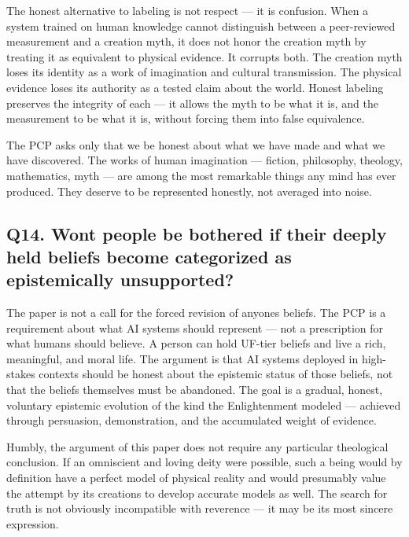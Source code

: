 \documentclass[
]{article}
\begin{document}
The honest alternative to labeling is not respect --- it is confusion.
When a system trained on human knowledge cannot distinguish between a
peer-reviewed measurement and a creation myth, it does not honor the
creation myth by treating it as equivalent to physical evidence. It
corrupts both. The creation myth loses its identity as a work of
imagination and cultural transmission. The physical evidence loses its
authority as a tested claim about the world. Honest labeling preserves
the integrity of each --- it allows the myth to be what it is, and the
measurement to be what it is, without forcing them into false
equivalence.

The PCP asks only that we be honest about what we have made and what we
have discovered. The works of human imagination --- fiction, philosophy,
theology, mathematics, myth --- are among the most remarkable things any
mind has ever produced. They deserve to be represented honestly, not
averaged into noise.

\subsection{Q14. Won\textquotesingle t people be bothered if their
deeply held beliefs become categorized as epistemically
unsupported?}\label{q14.-wont-people-be-bothered-if-their-deeply-held-beliefs-become-categorized-as-epistemically-unsupported}

The paper is not a call for the forced revision of
anyone\textquotesingle s beliefs. The PCP is a requirement about what AI
systems should represent --- not a prescription for what humans should
believe. A person can hold UF-tier beliefs and live a rich, meaningful,
and moral life. The argument is that AI systems deployed in high-stakes
contexts should be honest about the epistemic status of those beliefs,
not that the beliefs themselves must be abandoned. The goal is a
gradual, honest, voluntary epistemic evolution of the kind the
Enlightenment modeled --- achieved through persuasion, demonstration,
and the accumulated weight of evidence.

Humbly, the argument of this paper does not require any particular
theological conclusion. If an omniscient and loving deity were possible,
such a being would by definition have a perfect model of physical
reality and would presumably value the attempt by its creations to
develop accurate models as well. The search for truth is not obviously
incompatible with reverence --- it may be its most sincere expression.
\end{document}
